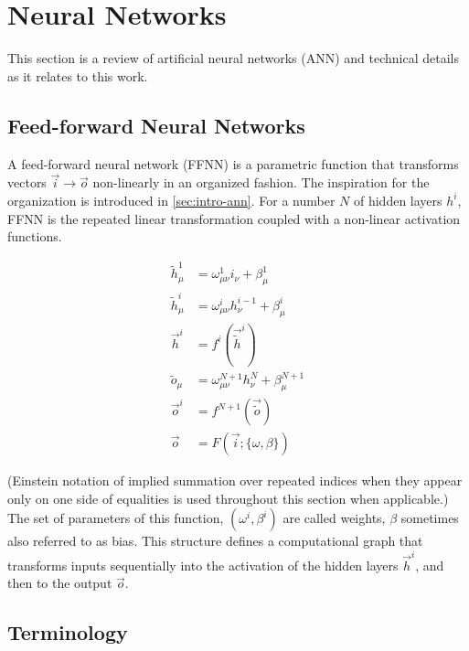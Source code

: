 \documentclass[../dissertation.tex]{subfiles}
\begin{document}

\section{Neural Networks}
\label{sec:nn}

This section is a review of artificial neural networks (ANN) and technical details as it relates to this work.

\subsection{Feed-forward Neural Networks}

A feed-forward neural network (FFNN) is a parametric function that transforms vectors $\vec{i} \rightarrow \vec{o}$ non-linearly in an organized fashion.
The inspiration for the organization is introduced in \cref{sec:intro-ann}.
For a number $N$ of hidden layers $h^i$, FFNN is the repeated linear transformation coupled with a non-linear activation functions.

\begin{align}
    \label{eqn:ffnn-rules}
    \tilde{h}^1_\mu     & = \omega^1_{ \mu \nu } i_\nu          + \beta^1_\mu       \\
    \tilde{h}^i_\mu     & = \omega^i_{ \mu \nu } h^{i - 1}_\nu  + \beta^i_\mu       \\
    \vec{h}^i           & = f^i \left( \vec{\tilde{h}}^i \right)                    \\
    \tilde{o}_\mu       & = \omega^{N+1}_{ \mu \nu } h^N_\nu    + \beta^{N+1}_\mu   \\
    \vec{o}^i           & = f^{N+1} \left( \vec{\tilde{o}} \right)                  \\
    \vec{o}             & = F \left( \vec{i} ; \{ \omega, \beta \} \right)
\end{align}

(Einstein notation of implied summation over repeated indices when they appear only on one side of equalities is used throughout this section when applicable.)
The set of parameters of this function, $( \omega^i, \beta^i )$ are called weights, $\beta$ sometimes also referred to as bias.
This structure defines a computational graph that transforms inputs sequentially into the activation of the hidden layers $\vec{h}^i$, and then to the output $\vec{o}$.

\subsection{Terminology}
\end{document}
